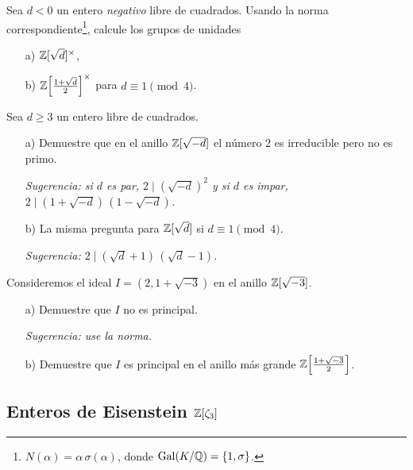 \begin{ejercicio}
  Sea $d < 0$ un entero \emph{negativo} libre de cuadrados. Usando la norma
  correspondiente\footnote{$N (\alpha) = \alpha\,\sigma (\alpha)$, donde
    $\operatorname{Gal} (K/\mathbb{Q}) = \{ 1, \sigma \}$.}, calcule los grupos de unidades

  \begin{enumerate}
  \item[a)] $\mathbb{Z} [\sqrt{d}]^\times$,
  \item[b)] $\mathbb{Z} \Bigl[\frac{1+\sqrt{d}}{2}\Bigr]^\times$ para
    $d \equiv 1 \pmod{4}$.
  \end{enumerate}
\end{ejercicio}

\begin{ejercicio}
  Sea $d \ge 3$ un entero libre de cuadrados.

  \begin{enumerate}
    \item[a)] Demuestre que en el anillo $\mathbb{Z} [\sqrt{-d}]$ el número $2$ es
      irreducible pero no es primo.

      \emph{Sugerencia: si $d$ es par, $2 \mid (\sqrt{-d})^2$ y si $d$ es impar,
      $2 \mid (1 + \sqrt{-d})\,(1 - \sqrt{-d})$.}

    \item[b)] La misma pregunta para $\mathbb{Z} [\sqrt{d}]$ si $d \equiv 1 \pmod{4}$.

      \emph{Sugerencia: $2 \mid (\sqrt{d} + 1)\,(\sqrt{d} - 1)$.}
  \end{enumerate}
\end{ejercicio}

\begin{ejercicio}
  Consideremos el ideal $I = (2, 1 + \sqrt{-3})$ en el anillo $\mathbb{Z} [\sqrt{-3}]$.

  \begin{enumerate}
  \item[a)] Demuestre que $I$ no es principal.

    \emph{Sugerencia: use la norma.}

  \item[b)] Demuestre que $I$ es principal en el anillo más grande
    $\mathbb{Z} \Bigl[\frac{1+\sqrt{-3}}{2}\Bigr]$.
  \end{enumerate}
\end{ejercicio}

\subsection*{Enteros de Eisenstein $\mathbb{Z} [\zeta_3]$}

